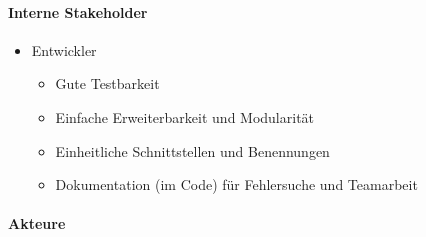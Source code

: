 \paragraph{Interne Stakeholder}
\begin{itemize}
    \item Entwickler
    \begin{itemize}
        \item Gute Testbarkeit
        \item Einfache Erweiterbarkeit und Modularität
        \item Einheitliche Schnittstellen und Benennungen
        \item Dokumentation (im Code) für Fehlersuche und Teamarbeit
    \end{itemize}
\end{itemize}

\paragraph{Akteure}

